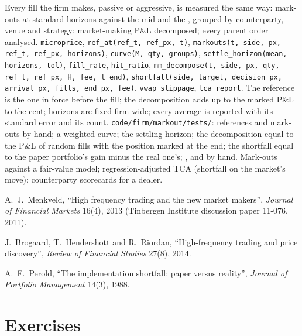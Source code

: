 \begin{build}
 Every fill the firm makes, passive or aggressive, is measured the same way: mark-outs at standard horizons against the mid and the ,
grouped by counterparty, venue and strategy; market-making P\&L decomposed; every parent order analysed.
 \texttt{microprice}, \texttt{ref\_at(ref\_t, ref\_px, t)}, \texttt{markouts(t, side, px, ref\_t, ref\_px, horizons)}, \texttt{curve(M, qty,
groups)}, \texttt{settle\_horizon(mean, horizons, tol)}, \texttt{fill\_rate}, \texttt{hit\_ratio}, \texttt{mm\_decompose(t, side, px, qty, ref\_t, ref\_px, H, fee,
t\_end)}, \texttt{shortfall(side, target, decision\_px, arrival\_px, fills, end\_px, fee)}, \texttt{vwap\_slippage}, \texttt{tca\_report}.
 The reference is the one in force before the fill; the decomposition adds up to the marked P\&L to the cent; horizons are fixed firm-wide;
every average is reported with its standard error and its count.
 \texttt{code/firm/markout/tests/}: references and mark-outs by hand; a weighted curve; the settling horizon; the decomposition equal to
the P\&L of random fills with the position marked at the end; the shortfall equal to the paper portfolio's gain minus the real one's; ,  and
 by hand.
 Mark-outs against a fair-value model; regression-adjusted TCA (shortfall on the market's move); counterparty scorecards for a dealer.
\end{build}

\begin{omsources}
\item A.~J.~Menkveld, ``High frequency trading and the new market makers'', \emph{Journal of Financial Markets} 16(4), 2013 (Tinbergen Institute discussion
paper 11-076, 2011).
\item J.~Brogaard, T.~Hendershott and R.~Riordan, ``High-frequency trading and price discovery'', \emph{Review of Financial Studies} 27(8), 2014.
\item A.~F.~Perold, ``The implementation shortfall: paper versus reality'', \emph{Journal of Portfolio Management} 14(3), 1988.
\end{omsources}

\section{Exercises}

